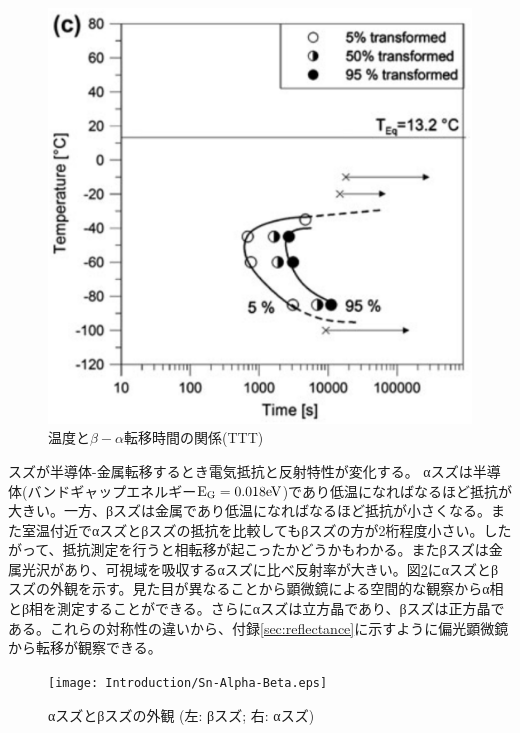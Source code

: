 \begin{figure}[!h]
\begin{minipage}{0.5\hsize}
\begin{center}
   \includegraphics[width=\hsize]{Introduction/TTT.eps}
  \end{center}
  \caption{温度と$\beta-\alpha$転移時間の関係(TTT)}
  \label{fig:TTT}
  \end{minipage}
\end{figure}

スズが半導体-金属転移するとき電気抵抗と反射特性が変化する。
αスズは半導体(バンドギャップエネルギー$\rm E_G=0.018eV$)であり低温になればなるほど抵抗が大きい。一方、βスズは金属であり低温になればなるほど抵抗が小さくなる。また室温付近でαスズとβスズの抵抗を比較してもβスズの方が2桁程度小さい。したがって、抵抗測定を行うと相転移が起こったかどうかもわかる。またβスズは金属光沢があり、可視域を吸収するαスズに比べ反射率が大きい。図\ref{fig:Sn-Alpha-Beta}にαスズとβスズの外観を示す\cite{wiki}。見た目が異なることから顕微鏡による空間的な観察からα相とβ相を測定することができる。さらにαスズは立方晶であり、βスズは正方晶である。これらの対称性の違いから、付録\ref{sec:reflectance}に示すように偏光顕微鏡から転移が観察できる\cite{Matvienko}。
\begin{figure}[!h]
    \begin{center}
   \texttt{[image: Introduction/Sn-Alpha-Beta.eps]}
  \end{center}
  \caption{αスズとβスズの外観 (左: βスズ; 右: αスズ)}
  \label{fig:Sn-Alpha-Beta}
\end{figure}

